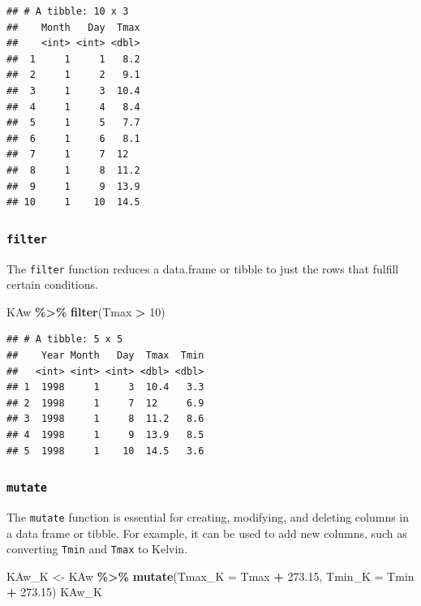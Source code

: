 \documentclass[
]{article}
\newenvironment{Shaded}{\begin{snugshade}}{\end{snugshade}}
\newcommand{\AttributeTok}[1]{\textcolor[rgb]{0.13,0.29,0.53}{#1}}
\newcommand{\DecValTok}[1]{\textcolor[rgb]{0.00,0.00,0.81}{#1}}
\newcommand{\FloatTok}[1]{\textcolor[rgb]{0.00,0.00,0.81}{#1}}
\newcommand{\FunctionTok}[1]{\textcolor[rgb]{0.13,0.29,0.53}{\textbf{#1}}}
\newcommand{\NormalTok}[1]{#1}
\newcommand{\OtherTok}[1]{\textcolor[rgb]{0.56,0.35,0.01}{#1}}
\newcommand{\SpecialCharTok}[1]{\textcolor[rgb]{0.81,0.36,0.00}{\textbf{#1}}}
\begin{document}
\begin{verbatim}
## # A tibble: 10 x 3
##    Month   Day  Tmax
##    <int> <int> <dbl>
##  1     1     1   8.2
##  2     1     2   9.1
##  3     1     3  10.4
##  4     1     4   8.4
##  5     1     5   7.7
##  6     1     6   8.1
##  7     1     7  12  
##  8     1     8  11.2
##  9     1     9  13.9
## 10     1    10  14.5
\end{verbatim}

\subsubsection{\texorpdfstring{\texttt{filter}}{filter}}\label{filter}

The \texttt{filter} function reduces a data.frame or tibble to just the rows that fulfill certain conditions.

\begin{Shaded}
\begin{Highlighting}[]
\NormalTok{KAw }\SpecialCharTok{\%\textgreater{}\%} \FunctionTok{filter}\NormalTok{(Tmax }\SpecialCharTok{\textgreater{}} \DecValTok{10}\NormalTok{)}
\end{Highlighting}
\end{Shaded}

\begin{verbatim}
## # A tibble: 5 x 5
##    Year Month   Day  Tmax  Tmin
##   <int> <int> <int> <dbl> <dbl>
## 1  1998     1     3  10.4   3.3
## 2  1998     1     7  12     6.9
## 3  1998     1     8  11.2   8.6
## 4  1998     1     9  13.9   8.5
## 5  1998     1    10  14.5   3.6
\end{verbatim}

\subsubsection{\texorpdfstring{\texttt{mutate}}{mutate}}\label{mutate}

The \texttt{mutate} function is essential for creating, modifying, and deleting columns in a data frame or tibble. For example, it can be used to add new columns, such as converting \texttt{Tmin} and \texttt{Tmax} to Kelvin.

\begin{Shaded}
\begin{Highlighting}[]
\NormalTok{KAw\_K }\OtherTok{\textless{}{-}}\NormalTok{ KAw }\SpecialCharTok{\%\textgreater{}\%} \FunctionTok{mutate}\NormalTok{(}\AttributeTok{Tmax\_K =}\NormalTok{ Tmax }\SpecialCharTok{+} \FloatTok{273.15}\NormalTok{, }\AttributeTok{Tmin\_K =}\NormalTok{ Tmin }\SpecialCharTok{+} \FloatTok{273.15}\NormalTok{)}
\NormalTok{KAw\_K}
\end{Highlighting}
\end{Shaded}
\end{document}
